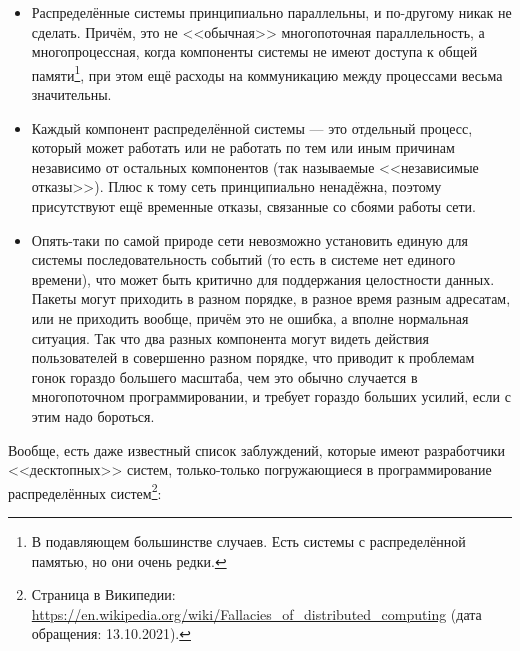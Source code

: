 \documentclass[a5paper]{article}
\begin{document}
\begin{itemize}
    \item Распределённые системы принципиально параллельны, и по-другому никак не сделать. Причём, это не <<обычная>> многопоточная параллельность, а многопроцессная, когда компоненты системы не имеют доступа к общей памяти\footnote{В подавляющем большинстве случаев. Есть системы с распределённой памятью, но они очень редки.}, при этом ещё расходы на коммуникацию между процессами весьма значительны.
    \item Каждый компонент распределённой системы --- это отдельный процесс, который может работать или не работать по тем или иным причинам независимо от остальных компонентов (так называемые <<независимые отказы>>). Плюс к тому сеть принципиально ненадёжна, поэтому присутствуют ещё временные отказы, связанные со сбоями работы сети.
    \item Опять-таки по самой природе сети невозможно установить единую для системы последовательность событий (то есть в системе нет единого времени), что может быть критично для поддержания целостности данных. Пакеты могут приходить в разном порядке, в разное время разным адресатам, или не приходить вообще, причём это не ошибка, а вполне нормальная ситуация. Так что два разных компонента могут видеть действия пользователей в совершенно разном порядке, что приводит к проблемам гонок гораздо большего масштаба, чем это обычно случается в многопоточном программировании, и требует гораздо больших усилий, если с этим надо бороться.
\end{itemize}

Вообще, есть даже известный список заблуждений, которые имеют разработчики <<десктопных>> систем, только-только погружающиеся в программирование распределённых систем\footnote{Страница в Википедии: \url{ https://en.wikipedia.org/wiki/Fallacies_of_distributed_computing} (дата обращения: 13.10.2021).}:
\end{document}
